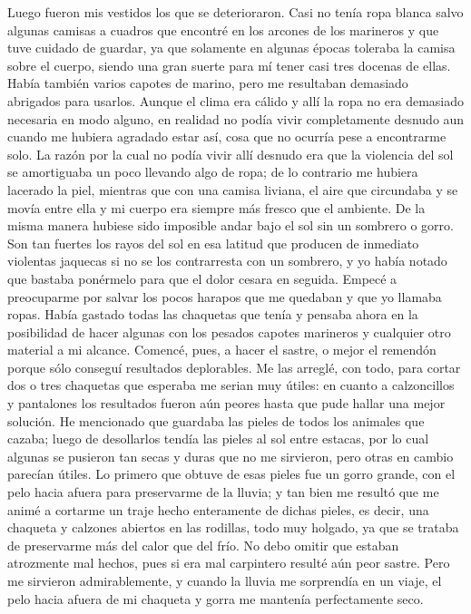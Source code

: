 \documentclass{novela}
\begin{document}
    Luego fueron mis vestidos los que se deterioraron. Casi no tenía ropa blanca salvo algunas camisas a cuadros que encontré en los arcones de los marineros y que tuve cuidado de guardar, ya que solamente en algunas épocas toleraba la camisa sobre el cuerpo, siendo una gran suerte para mí tener casi tres docenas de ellas. Había también varios capotes de marino, pero me resultaban demasiado abrigados para usarlos. Aunque el clima era cálido y allí la ropa no era demasiado necesaria en modo alguno, en realidad no podía vivir completamente desnudo aun cuando me hubiera agradado estar así, cosa que no ocurría pese a encontrarme solo.
    La razón por la cual no podía vivir allí desnudo era que la violencia del sol se amortiguaba un poco llevando algo de ropa; de lo contrario me hubiera lacerado la piel, mientras que con una camisa liviana, el aire que circundaba y se movía entre ella y mi cuerpo era siempre más fresco que el ambiente. De la misma manera hubiese sido imposible andar bajo el sol sin un sombrero o gorro. Son tan fuertes los rayos del sol en esa latitud que producen de inmediato violentas jaquecas si no se los contrarresta con un sombrero, y yo había notado que bastaba ponérmelo para que el dolor cesara en seguida.
    Empecé a preocuparme por salvar los pocos harapos que me quedaban y que yo llamaba ropas. Había gastado todas las chaquetas que tenía y pensaba ahora en la posibilidad de hacer algunas con los pesados capotes marineros y cualquier otro material a mi alcance. Comencé, pues, a hacer el sastre, o mejor el remendón porque sólo conseguí resultados deplorables. Me las arreglé, con todo, para cortar dos o tres chaquetas que esperaba me serian muy útiles: en cuanto a calzoncillos y pantalones los resultados fueron aún peores hasta que pude hallar una mejor solución.
    He mencionado que guardaba las pieles de todos los animales que cazaba; luego de desollarlos tendía las pieles al sol entre estacas, por lo cual algunas se pusieron tan secas y duras que no me sirvieron, pero otras en cambio parecían útiles. Lo primero que obtuve de esas pieles fue un gorro grande, con el pelo hacia afuera para preservarme de la lluvia; y tan bien me resultó que me animé a cortarme un traje hecho enteramente de dichas pieles, es decir, una chaqueta y calzones abiertos en las rodillas, todo muy holgado, ya que se trataba de preservarme más del calor que del frío. No debo omitir que estaban atrozmente mal hechos, pues si era mal carpintero resulté aún peor sastre. Pero me sirvieron admirablemente, y cuando la lluvia me sorprendía en un viaje, el pelo hacia afuera de mi chaqueta y gorra me mantenía perfectamente seco.
\end{document}
